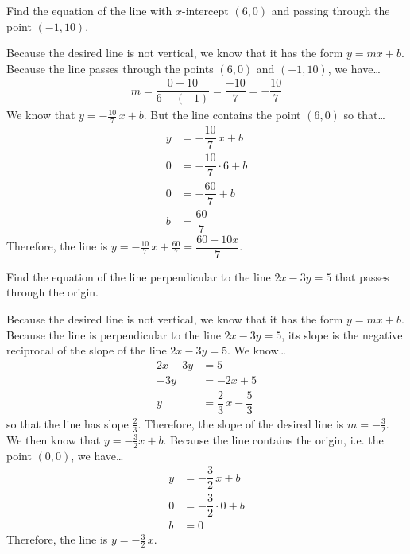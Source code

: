 \documentclass[11pt,letterpaper]{article}
\begin{document}
\newpage



 Find the equation of the line with $x$-intercept $(6, 0)$ and passing through the point $(-1, 10)$. \pspace

\sol Because the desired line is not vertical, we know that it has the form $y= mx + b$. Because the line passes through the points $(6, 0)$ and $(-1, 10)$, we have\dots
	\[
	\begin{aligned}
	m= \dfrac{0 - 10}{6 - (-1)}= \dfrac{-10}{7}= -\dfrac{10}{7}
	\end{aligned}
	\]
We know that $y= -\frac{10}{7}\,x + b$. But the line contains the point $(6, 0)$ so that\dots
	\[
	\begin{aligned}
	y&= -\dfrac{10}{7}\,x + b \\[0.3cm]
	0&= -\dfrac{10}{7} \cdot 6 + b \\[0.3cm]
	0&= -\dfrac{60}{7} + b \\[0.3cm]
	b&= \dfrac{60}{7}
	\end{aligned}
	\]
Therefore, the line is $y= -\frac{10}{7}\,x + \frac{60}{7}= \dfrac{60 - 10x}{7}$. 



\newpage



 Find the equation of the line perpendicular to the line $2x - 3y= 5$ that passes through the origin. \pspace

\sol Because the desired line is not vertical, we know that it has the form $y= mx + b$. Because the line is perpendicular to the line $2x - 3y= 5$, its slope is the negative reciprocal of the slope of the line $2x - 3y= 5$. We know\dots
	\[
	\begin{aligned}
	2x - 3y&= 5 \\[0.3cm]
	-3y&= -2x + 5 \\[0.3cm]
	y&= \dfrac{2}{3}\,x - \dfrac{5}{3}
	\end{aligned}
	\] 
so that the line has slope $\frac{2}{3}$. Therefore, the slope of the desired line is $m= -\frac{3}{2}$. We then know that $y= -\frac{3}{2}x + b$. Because the line contains the origin, i.e. the point $(0, 0)$, we have\dots
	\[
	\begin{aligned}
	y&= -\dfrac{3}{2}\,x + b \\[0.3cm]
	0&= -\dfrac{3}{2} \cdot 0 + b \\[0.3cm]
	b&= 0
	\end{aligned}
	\] 
Therefore, the line is $y= -\frac{3}{2}\,x$. 
\end{document}
